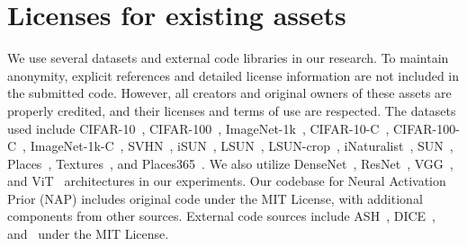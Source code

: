 \section{Licenses for existing assets}
\label{appendix:license}
We use several datasets and external code libraries in our research. To maintain anonymity, explicit references and detailed license information are not included in the submitted code. However, all creators and original owners of these assets are properly credited, and their licenses and terms of use are respected. The datasets used include CIFAR-10~\cite{krizhevsky2009cifar}, CIFAR-100~\cite{krizhevsky2009cifar}, ImageNet-1k~\cite{deng2009imagenet}, CIFAR-10-C~\cite{hendrycks2018corp}, CIFAR-100-C~\cite{hendrycks2018corp}, ImageNet-1k-C~\cite{hendrycks2018corp}, SVHN~\cite{netzer2011svhn}, iSUN~\cite{xu2015isun}, LSUN~\cite{yu2015lsun}, LSUN-crop~\cite{yu2015lsun}, iNaturalist~\cite{van2018inaturalist}, SUN~\cite{xiao2010sun}, Places~\cite{zhou2017places}, Textures~\cite{cimpoi2014texture}, and Places365~\cite{zhou2017places}. We also utilize DenseNet~\cite{huang2017densely}, ResNet~\cite{he2016deep}, VGG~\cite{simonyan2015very}, and ViT~\cite{dosovitskiy2020image} architectures in our experiments.
Our codebase for Neural Activation Prior (NAP) includes original code under the MIT License, with additional components from other sources. External code sources include ASH~\cite{djurisic2022extremely}, DICE~\cite{sun2022dice}, and~\cite{sun2022knn} under the MIT License.

\clearpage